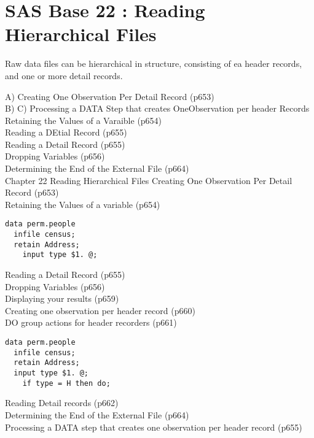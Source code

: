 \section{SAS Base 22 : Reading Hierarchical Files}
Raw data files can be hierarchical in structure, consisting of ea header records, and one or more
detail records.

A) Creating One Observation Per Detail Record (p653)\\
B)
C) Processing a DATA Step that creates OneObservation per header Records
Retaining the Values of a Varaible (p654)\\
Reading a DEtial Record (p655)\\
Reading a Detail Record (p655)\\
Dropping Variables (p656)\\
Determining the End of the External File (p664)\\
Chapter 22 Reading Hierarchical Files
Creating One Observation Per Detail Record (p653)\\
Retaining the Values of a variable (p654)\\
\begin{framed}
\begin{verbatim}
data perm.people
  infile census;
  retain Address;
 	input type $1. @;
\end{verbatim}
\end{framed}


Reading a Detail Record (p655)\\
Dropping Variables (p656)\\
Displaying your results (p659)\\
Creating one observation per header record (p660)\\
DO group actions for header recorders (p661)\\

\begin{framed}
\begin{verbatim}
data perm.people
  infile census;
  retain Address;
  input type $1. @;
 	if type = H then do;

\end{verbatim}
\end{framed}

Reading Detail records (p662)\\
Determining the End of the External File (p664)\\
Processing a DATA step that creates one observation per header record (p655)\\



